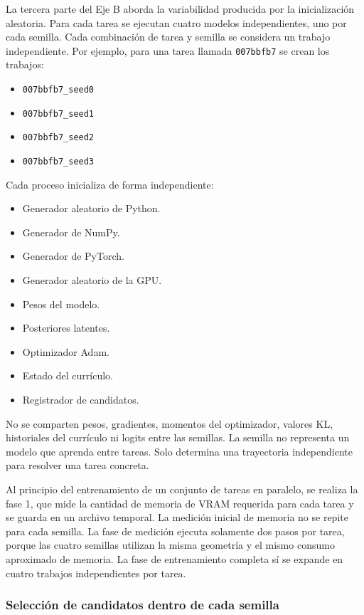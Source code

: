 \documentclass[11pt,a4paper,spanish]{book}
\numberwithin{equation}{chapter}
\numberwithin{figure}{chapter}
\begin{document}
La tercera parte del Eje B aborda la variabilidad producida por la inicialización aleatoria. Para cada tarea se ejecutan cuatro modelos
independientes, uno por cada semilla. Cada combinación de tarea y semilla se considera un trabajo independiente. Por
ejemplo, para una tarea llamada \texttt{007bbfb7} se crean los trabajos:

\begin{itemize}
	\item \texttt{007bbfb7\_seed0}
	\item \texttt{007bbfb7\_seed1}
	\item \texttt{007bbfb7\_seed2}
	\item \texttt{007bbfb7\_seed3}
\end{itemize}

Cada proceso inicializa de forma independiente:

\begin{itemize}
    \item Generador aleatorio de Python.
    \item Generador de NumPy.
    \item Generador de PyTorch.
    \item Generador aleatorio de la GPU.
    \item Pesos del modelo.
    \item Posteriores latentes.
    \item Optimizador Adam.
    \item Estado del currículo.
    \item Registrador de candidatos.
\end{itemize}

No se comparten pesos, gradientes, momentos del optimizador, valores KL,
historiales del currículo ni logits entre las semillas. La semilla no representa
un modelo que aprenda entre tareas. Solo determina una trayectoria
independiente para resolver una tarea concreta.

Al principio del entrenamiento de un conjunto de tareas
en paralelo, se realiza la fase 1, que mide la cantidad de memoria
de VRAM requerida para cada tarea y se guarda en un archivo temporal.
La medición inicial de memoria no se repite para cada semilla. La fase de
medición ejecuta solamente dos pasos por tarea, porque las cuatro semillas
utilizan la misma geometría y el mismo consumo aproximado de memoria. La fase
de entrenamiento completa sí se expande en cuatro trabajos independientes por
tarea.

\subsubsection{Selección de candidatos dentro de cada semilla}
\end{document}
